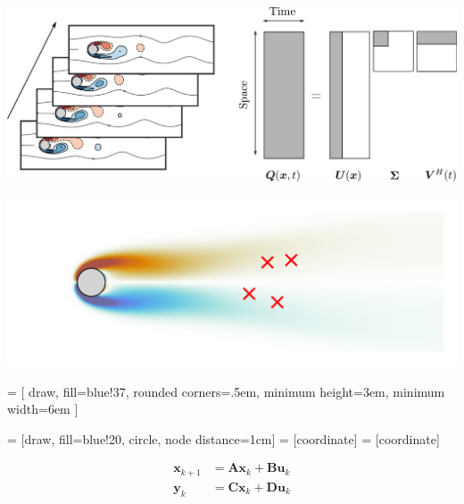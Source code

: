 \documentclass[aspectratio=169, usenames, dvipsnames]{beamer}
\begin{document}
{

  \begin{frame}
    \vfill
    \centering

    \includegraphics[width=\textwidth]{svd_pod}

    \vfill
  \end{frame}

  \begin{frame}
    \vfill
    \centering

    
    \includegraphics[width=\textwidth]{mean_flow_sensors}
    
    \vfill
  \end{frame}

  {
    
     = [
    draw,
    fill=blue!37,
    rounded corners=.5em,
    minimum height=3em,
    minimum width=6em
    ]
    
     = [draw, fill=blue!20, circle, node distance=1cm]
     = [coordinate]
     = [coordinate]
    
    \begin{frame}
      \vfill
      \centering
      
      \Large
      
      \[
        \begin{aligned}
          \bm{x}_{k+1} & = \bm{Ax}_k + \bm{Bu}_k \\
          \bm{y}_k & = \bm{Cx}_k + \bm{Du}_k
        \end{aligned}
      \]
      

\end{frame}}}
\end{document}
